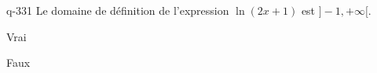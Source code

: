 \begin{truefalse}{q-331}
Le domaine de définition de l'expression $\ln(2x+1)$ est $]-1,+\infty[$.
\item Vrai
\item* Faux
\end{truefalse}

